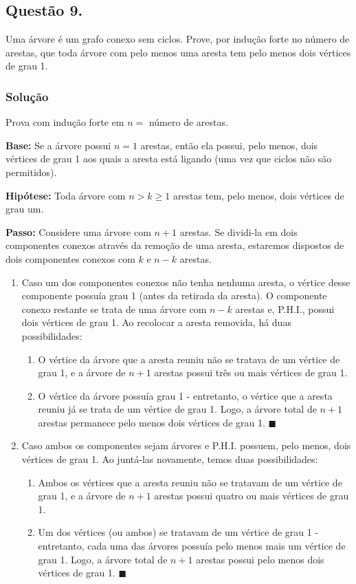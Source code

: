\documentclass[12pt, letterpaper]{report}
\newcommand*{\CQD}{\hfill\ensuremath{\blacksquare}}%
\newcounter{ProblemNum}
\newcommand*{\anyproblem}[1]{\newpage\subsection*{#1}}
\newcommand*{\problem}[1]{\stepcounter{ProblemNum} %
   \anyproblem{Questão #1}}
\newcommand*{\soln}[1]{\subsubsection*{#1}}
\newcommand*{\solution}{\soln{Solução}}
\begin{document}
\problem{9.}
  Uma árvore é um grafo conexo sem ciclos. Prove, por indução forte no número de arestas, que toda árvore com pelo menos uma aresta tem pelo menos dois vértices de grau 1.

\solution
  Prova com indução forte em $n = $ número de arestas.

  \textbf{Base:} Se a árvore possui $ n = 1$ arestas, então ela possui, pelo menos, dois vértices de grau 1 aos quais a aresta está ligando (uma vez que ciclos não são permitidos).

  \textbf{Hipótese:} Toda árvore com $ n > k \geq 1$ arestas tem, pelo menos, dois vértices de grau um.

  \textbf{Passo:} Considere uma árvore com $n + 1$ arestas. Se dividi-la em dois componentes conexos através da remoção de uma aresta, estaremos dispostos de dois componentes conexos com $k$ e $n - k$ arestas.

  \begin{enumerate}[label=\arabic*.]
    \item Caso um dos componentes conexos não tenha nenhuma aresta, o vértice desse componente possuía grau 1 (antes da retirada da aresta). O componente conexo restante se trata de uma árvore com $n - k$ arestas e, P.H.I., possui dois vértices de grau 1. Ao recolocar a aresta removida, há duas possibilidades: 
      \begin{enumerate}[label=\arabic*.]
        \item O vértice da árvore que a aresta reuniu não se tratava de um vértice de grau 1, e a árvore de $n + 1$ arestas possui três ou mais vértices de grau 1.
        \item O vértice da árvore possuía grau 1 - entretanto, o vértice que a aresta reuniu já se trata de um vértice de grau 1. Logo, a árvore total de $n + 1$ arestas permanece pelo menos dois vértices de grau 1. \CQD
      \end{enumerate} 
    \item Caso ambos os componentes sejam árvores e P.H.I. possuem, pelo menos, dois vértices de grau 1. Ao juntá-las novamente, temos duas possibilidades:

      \begin{enumerate}[label=\arabic*.]
        \item Ambos os vértices que a aresta reuniu não se tratavam de um vértice de grau 1, e a árvore de $n + 1$ arestas possui quatro ou mais vértices de grau 1.
        \item Um dos vértices (ou ambos) se tratavam de um vértice de grau 1 - entretanto, cada uma das árvores possuía pelo menos mais um vértice de grau 1. Logo, a árvore total de $n + 1$ arestas possui pelo menos dois vértices de grau 1. \CQD
      \end{enumerate}
  \end{enumerate}
\end{document}
